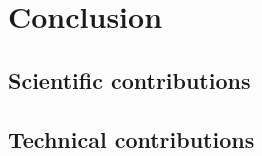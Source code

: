 \chapter{Conclusion}
\label{chapter|conclusion}

\section{Scientific contributions}
\label{sect|scientific-contributions}

\section{Technical contributions}
\label{sect|technical-contributions}
